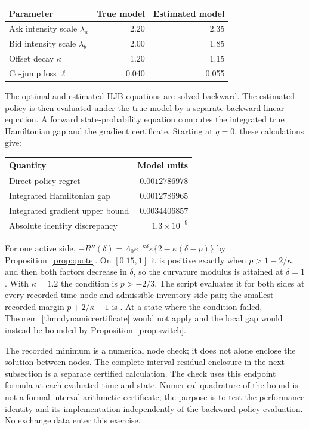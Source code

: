 \documentclass[11pt]{article}
\theoremstyle{plain}
\theoremstyle{definition}
\theoremstyle{remark}
\begin{document}
\begin{center}
\begin{tabular}{@{}lrr@{}}
\toprule
Parameter&True model&Estimated model\\
\midrule
Ask intensity scale \(\lambda_a\)&2.20&2.35\\
Bid intensity scale \(\lambda_b\)&2.00&1.85\\
Offset decay \(\kappa\)&1.20&1.15\\
Co-jump loss \(\ell\)&0.040&0.055\\
\bottomrule
\end{tabular}
\end{center}

The optimal and estimated HJB equations are solved backward. The
estimated policy is then evaluated under the true model by a separate
backward linear equation. A forward state-probability equation computes
the integrated true Hamiltonian gap and the gradient certificate.
Starting at \(q=0\), these calculations give:

\begin{center}
\begin{tabular}{@{}lr@{}}
\toprule
Quantity&Model units\\
\midrule
Direct policy regret&\(0.0012786978\)\\
Integrated Hamiltonian gap&\(0.0012786965\)\\
Integrated gradient upper bound&\(0.0034406857\)\\
Absolute identity discrepancy&\(1.3\times10^{-9}\)\\
\bottomrule
\end{tabular}
\end{center}

For one active side, $-R''(\delta)=\Lambda_0e^{-\kappa\delta}\kappa\{2-\kappa(\delta-p)\}$
by Proposition~\ref{prop:quote}. On $[0.15,1]$ it is positive exactly when
$p>1-2/\kappa$, and then both factors decrease in $\delta$, so the curvature
modulus is attained at $\delta=1$. With $\kappa=1.2$ the condition is
$p>-2/3$. The script evaluates it for both sides at every recorded time node and
admissible inventory-side pair; the smallest recorded margin $p+2/\kappa-1$ is . At a state
where the condition failed, Theorem~\ref{thm:dynamiccertificate} would not apply and the local gap would
instead be bounded by Proposition~\ref{prop:switch}.

The recorded minimum is a numerical node check; it does not alone enclose
the solution between nodes. The complete-interval residual enclosure in
the next subsection is a separate certified calculation.
 The check
uses this endpoint formula at each evaluated time and state. Numerical
quadrature of the bound is not a formal interval-arithmetic certificate;
the purpose is to test the performance identity and its implementation
independently of the backward policy evaluation. No exchange data enter
this exercise.
\end{document}
